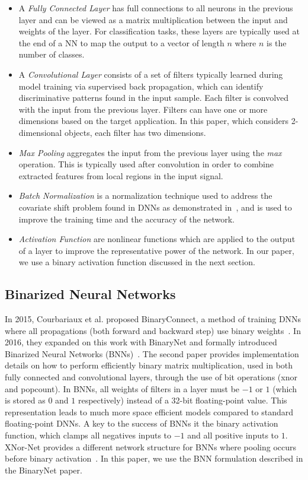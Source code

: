 \documentclass[10pt,emptycopyrightspace]{ewsn-proc}
\begin{document}
\begin{itemize}
    \item A \textit{Fully Connected Layer} has full connections to all neurons in the previous layer and can be viewed as a matrix multiplication between the input and weights of the layer. For classification tasks, these layers are typically used at the end of a NN to map the output to a vector of length $n$ where $n$ is the number of classes.
    \item A \textit{Convolutional Layer} consists of a set of filters typically learned during model training via supervised back propagation, which can identify discriminative patterns found in the input sample. Each filter is convolved with the input from the previous layer. Filters can have one or more dimensions based on the target application. In this paper, which considers 2-dimensional objects, each filter has two dimensions.
    \item \textit{Max Pooling} aggregates the input from the previous layer using the \textit{max} operation. This is typically used after convolution in order to combine extracted features from local regions in the input signal.
    \item \textit{Batch Normalization} is a normalization technique used to address the covariate shift problem found in DNNs as demonstrated in~\cite{ioffe2015batch}, and is used to improve the training time and the accuracy of the network.
    \item \textit{Activation Function} are nonlinear functions which are applied to the output of a layer to improve the representative power of the network. In our paper, we use a binary activation function discussed in the next section.
\end{itemize}


\subsection{Binarized Neural Networks}
In 2015, Courbariaux et al. proposed BinaryConnect, a method of training DNNs where all propagations (both forward and backward step) use binary weights~\cite{courbariaux2015binaryconnect}. In 2016, they expanded on this work with BinaryNet and formally introduced Binarized Neural Networks (BNNs)~\cite{courbariaux2016binarynet}. The second paper provides implementation details on how to perform efficiently binary matrix multiplication, used in both fully connected and convolutional layers, through the use of bit operations (xnor and popcount). In BNNs, all weights of filters in a layer must be $-1$ or $1$ (which is stored as $0$ and $1$ respectively) instead of a 32-bit floating-point value. This representation leads to much more space efficient models compared to standard floating-point DNNs. A key to the success of BNNs it the binary activation function, which clamps all negatives inputs to $-1$ and all positive inputs to $1$.  XNor-Net provides a different network structure for BNNs where pooling occurs before binary activation~\cite{rastegari2016xnor}. In this paper, we use the BNN formulation described in the BinaryNet paper. 
\end{document}

